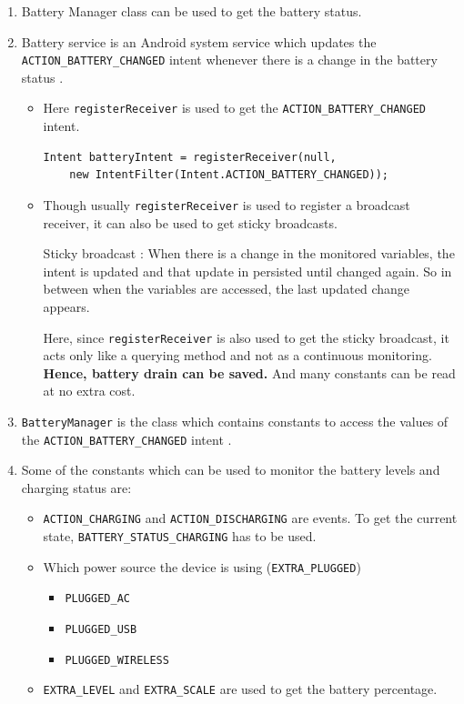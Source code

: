\documentclass{article}
\begin{document}
\begin{enumerate}
    \item Battery Manager class can be used to get the battery status.
    \item Battery service is an Android system service which updates the \texttt{ACTION\_BATTERY\_CHANGED} intent whenever there is a change in the battery status \cite{Android_BatteryMonitoring}.
    
    \begin{itemize}
        \item Here \texttt{registerReceiver} is used to get the \texttt{ACTION\_BATTERY\_CHANGED} intent.
        
  \begin{lstlisting}[caption={Accessing intent to get battery status},label={label: accessing intent to get battery status}]
    Intent batteryIntent = registerReceiver(null, 
    new IntentFilter(Intent.ACTION_BATTERY_CHANGED));
 \end{lstlisting} 

        \item Though usually \texttt{registerReceiver} is used to register a broadcast receiver, it can also be used to get sticky broadcasts. 
        
        Sticky broadcast : When there is a change in the monitored variables, the intent is updated and that update in persisted until changed again. 
        So in between when the variables are accessed, the last updated change appears.

        Here, since \texttt{registerReceiver} is also used to get the sticky broadcast, it acts only like a querying method and not as a continuous monitoring. 
        \textbf{Hence, battery drain can be saved.} And many constants can be read at no extra cost.
    \end{itemize}

    \item \texttt{BatteryManager} is the class which contains constants to access the values of the \texttt{ACTION\_BATTERY\_CHANGED} intent \cite{Android_BatteryManager}.
    
    \item Some of the constants which can be used to monitor the battery levels and charging status are:
    
    \begin{itemize}
        \item \texttt{ACTION\_CHARGING} and \texttt{ACTION\_DISCHARGING} are events. To get the current state, \texttt{BATTERY\_STATUS\_CHARGING} has to be used.
        \item Which power source the device is using (\texttt{EXTRA\_PLUGGED})
        \begin{itemize}
            \item \texttt{PLUGGED\_AC}
            \item \texttt{PLUGGED\_USB}
            \item \texttt{PLUGGED\_WIRELESS}
        \end{itemize}
        \item \texttt{EXTRA\_LEVEL} and \texttt{EXTRA\_SCALE} are used to get the battery percentage.
        

\end{itemize}
\end{enumerate}
\end{document}

